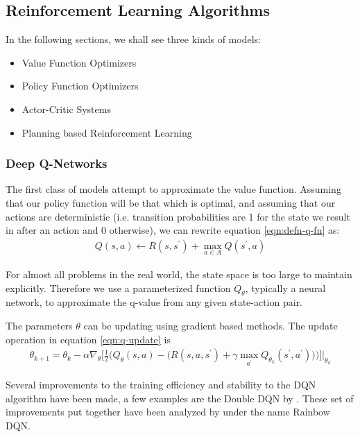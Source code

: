 \subsection{Reinforcement Learning Algorithms}

In the following sections, we shall see three kinds of models:
\begin{itemize}
    \item Value Function Optimizers
    \item Policy Function Optimizers
    \item Actor-Critic Systems
    \item Planning based Reinforcement Learning
\end{itemize}


\subsubsection{Deep Q-Networks}

The first class of models attempt to approximate the value function. Assuming that our policy function will be that which is optimal, and assuming that our actions are deterministic (i.e. transition probabilities are 1 for the state we result in after an action and 0 otherwise), we can rewrite equation \ref{eqn:defn-q-fn} as:
\begin{eqnarray}\label{eqn:defn-q-fn}
    Q(s, a) \leftarrow R(s, s^\prime) + \max_{a \in A} Q(s^\prime, a)
\end{eqnarray}

For almost all problems in the real world, the state space is too large to maintain explicitly. Therefore we use a parameterized function $Q_{\theta}$, typically a neural network, to approximate the q-value from any given state-action pair.

The parameters $\theta$ can be updating using gradient based methods. The update operation in equation \ref{eqn:q-update} is 
\begin{equation}
    \label{eqn:q-update}
    \begin{split}
        \theta_{k+1} = \theta_k - \alpha \nabla_\theta \Bigg[\frac{1}{2} \bigg(Q_\theta(s, a) - \Big(R(s, a, s^\prime) + \gamma \max_{a^\prime} Q_{\theta_k}(s^\prime, a^\prime)  \Big) \bigg) \Bigg] \Bigg\vert_{\theta_k}
    \end{split}
\end{equation}

Several improvements to the training efficiency and stability to the DQN algorithm have been made, a few examples are the Double DQN by \cite{double-dqn}. These set of improvements put together have been analyzed by \cite{rainbow-dqn} under the name Rainbow DQN.

